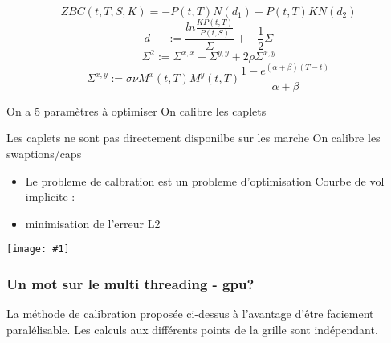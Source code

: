 \documentclass[paper=a4, fontsize=11pt]{report}
\numberwithin{equation}{section}		%
\numberwithin{figure}{section}			%
\numberwithin{table}{section}				%
\theoremstyle{definition}
\newcommand{\IMG}[3]{
  \begin{center}
    \texttt{[image: \#1]}%
    \end{center}
}
\begin{document}
$$ZBC(t, T, S, K) = -P(t, T) N( d_1 ) + P(t, T) K N(d_2)$$
$$d_{-+} := \frac{ln \frac{KP(t, T)}{P(t, S)}}{\Sigma} +- \frac{1}{2}\Sigma $$
$$\Sigma^2 := \Sigma^{x,x} + \Sigma^{y,y} + 2 \rho \Sigma^{x,y}$$
$$\Sigma^{x,y} := \sigma \nu M^x(t, T) M^y(t, T) \frac{1 - e^{(\alpha+\beta) (T-t)}}{\alpha+\beta} $$

On a 5 paramètres à optimiser
On calibre les caplets

Les caplets ne sont pas directement disponilbe sur les marche
On calibre les swaptions/caps

\begin{itemize}
\item Le probleme de calbration est un probleme d'optimisation Courbe
  de vol implicite :
\item minimisation de l'erreur L2
\end{itemize}
\IMG{img/capsurf.png}{Cap surface}{0.5}

\subsubsection{Un mot sur le multi threading - gpu?}
La méthode de calibration proposée ci-dessus à l'avantage d'être faciement paralélisable. Les calculs aux différents points de la grille sont indépendant.


\end{document}
